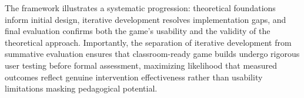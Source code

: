 The framework illustrates a systematic progression: theoretical foundations inform initial design, iterative development resolves implementation gaps, and final evaluation confirms both the game's usability and the validity of the theoretical approach. Importantly, the separation of iterative development from summative evaluation ensures that classroom-ready game builds undergo rigorous user testing before formal assessment, maximizing likelihood that measured outcomes reflect genuine intervention effectiveness rather than usability limitations masking pedagogical potential.
